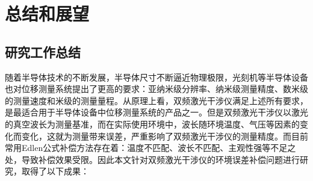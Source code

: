 \chapter{总结和展望}
\section{研究工作总结}
随着半导体技术的不断发展，半导体尺寸不断逼近物理极限，光刻机等半导体设备也对位移测量系统提出了更高的要求：亚纳米级分辨率、纳米级测量精度、数米级的测量速度和米级的测量量程。从原理上看，双频激光干涉仪满足上述所有要求，是最适合用于半导体设备中位移测量系统的产品之一。但是双频激光干涉仪以激光的真空波长为测量基准，而在实际使用环境中，波长随环境温度、气压等因素的变化而变化，这就为测量带来误差，严重影响了双频激光干涉仪的测量精度。而目前常用Edlen公式补偿方法存在着：温度不匹配、波长不匹配、主观性强等不足之处，导致补偿效果受限。因此本文针对双频激光干涉仪的环境误差补偿问题进行研究，取得了以下成果：
